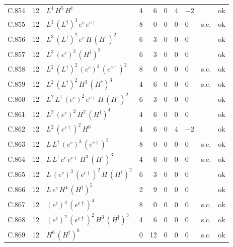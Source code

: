 {\begin{longtable}{@{}ll>{\raggedright\arraybackslash}p{6.4cm}rrllllr@{}}
C.854 & 12 & $L^{4}\,H^{5}\,H^\dagger$ & 4 & 6 & $0$ & $4$ & $-2$ &  & ok \\
C.855 & 12 & $L^{3}\,(L^\dagger)^{3}\,e^c\,e^{c\dagger}$ & 8 & 0 & $0$ & $0$ & $0$ & s.c. & ok \\
C.856 & 12 & $L^{3}\,(L^\dagger)^{2}\,e^c\,H\,(H^\dagger)^{2}$ & 6 & 3 & $0$ & $0$ & $0$ &  & ok \\
C.857 & 12 & $L^{3}\,(e^c)^{3}\,(H^\dagger)^{3}$ & 6 & 3 & $0$ & $0$ & $0$ &  & ok \\
C.858 & 12 & $L^{2}\,(L^\dagger)^{2}\,(e^c)^{2}\,(e^{c\dagger})^{2}$ & 8 & 0 & $0$ & $0$ & $0$ & s.c. & ok \\
C.859 & 12 & $L^{2}\,(L^\dagger)^{2}\,H^{3}\,(H^\dagger)^{3}$ & 4 & 6 & $0$ & $0$ & $0$ & s.c. & ok \\
C.860 & 12 & $L^{2}\,L^\dagger\,(e^c)^{2}\,e^{c\dagger}\,H\,(H^\dagger)^{2}$ & 6 & 3 & $0$ & $0$ & $0$ &  & ok \\
C.861 & 12 & $L^{2}\,(e^c)^{2}\,H^{2}\,(H^\dagger)^{4}$ & 4 & 6 & $0$ & $0$ & $0$ &  & ok \\
C.862 & 12 & $L^{2}\,(e^{c\dagger})^{2}\,H^{6}$ & 4 & 6 & $0$ & $4$ & $-2$ &  & ok \\
C.863 & 12 & $L\,L^\dagger\,(e^c)^{3}\,(e^{c\dagger})^{3}$ & 8 & 0 & $0$ & $0$ & $0$ & s.c. & ok \\
C.864 & 12 & $L\,L^\dagger\,e^c\,e^{c\dagger}\,H^{3}\,(H^\dagger)^{3}$ & 4 & 6 & $0$ & $0$ & $0$ & s.c. & ok \\
C.865 & 12 & $L\,(e^c)^{3}\,(e^{c\dagger})^{2}\,H\,(H^\dagger)^{2}$ & 6 & 3 & $0$ & $0$ & $0$ &  & ok \\
C.866 & 12 & $L\,e^c\,H^{4}\,(H^\dagger)^{5}$ & 2 & 9 & $0$ & $0$ & $0$ &  & ok \\
C.867 & 12 & $(e^c)^{4}\,(e^{c\dagger})^{4}$ & 8 & 0 & $0$ & $0$ & $0$ & s.c. & ok \\
C.868 & 12 & $(e^c)^{2}\,(e^{c\dagger})^{2}\,H^{3}\,(H^\dagger)^{3}$ & 4 & 6 & $0$ & $0$ & $0$ & s.c. & ok \\
C.869 & 12 & $H^{6}\,(H^\dagger)^{6}$ & 0 & 12 & $0$ & $0$ & $0$ & s.c. & ok \\
\end{longtable}}
